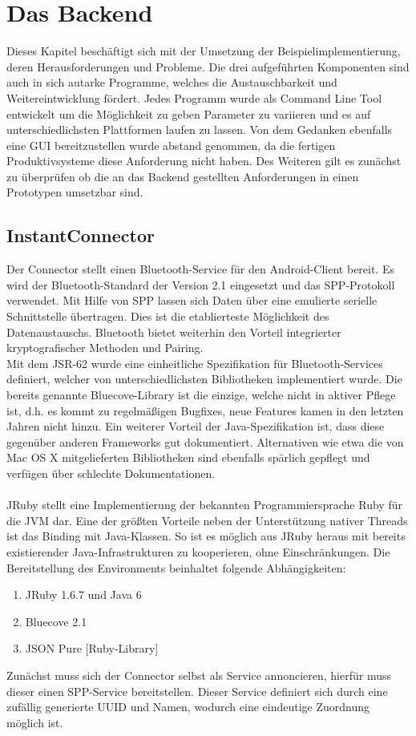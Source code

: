 \chapter{Das Backend}
Dieses Kapitel beschäftigt sich mit der Umsetzung der Beispielimplementierung, deren Herausforderungen und Probleme. Die drei aufgeführten Komponenten sind auch in sich autarke Programme, welches die Austauschbarkeit und Weitereintwicklung fördert. Jedes Programm wurde als Command Line Tool entwickelt um die Möglichkeit zu geben Parameter zu variieren und es auf unterschiedlichsten Plattformen laufen zu lassen. Von dem Gedanken ebenfalls eine GUI bereitzustellen wurde abstand genommen, da die fertigen Produktivsysteme diese Anforderung nicht haben. Des Weiteren gilt es zunächst zu überprüfen ob die an das Backend gestellten Anforderungen in einen Prototypen umsetzbar sind. 
\section{InstantConnector}
Der Connector stellt einen Bluetooth-Service für den Android-Client bereit. 
Es wird der Bluetooth-Standard der Version 2.1 eingesetzt und das SPP-Protokoll verwendet. Mit Hilfe von SPP lassen sich Daten über eine emulierte serielle Schnittstelle übertragen. Dies ist die etablierteste Möglichkeit des Datenaustauschs. Bluetooth bietet weiterhin den Vorteil integrierter kryptografischer Methoden und Pairing. \\
Mit dem JSR-62 wurde eine einheitliche Spezifikation für Bluetooth-Services definiert, welcher von unterschiedlichsten Bibliotheken implementiert wurde. Die bereits genannte Bluecove-Library ist die einzige, welche nicht in aktiver Pflege ist, d.h. es kommt zu regelmäßigen Bugfixes, neue Features kamen in den letzten Jahren nicht hinzu. Ein weiterer Vorteil der Java-Spezifikation ist, dass diese gegenüber anderen Frameworks gut dokumentiert. Alternativen wie etwa die von Mac OS X mitgelieferten Bibliotheken sind ebenfalls spärlich gepflegt und verfügen über schlechte Dokumentationen. 
\\\\
JRuby stellt eine Implementierung der bekannten Programmiersprache Ruby für die JVM dar. Eine der größten Vorteile neben der Unterstützung nativer Threads ist das Binding mit Java-Klassen. So ist es möglich aus JRuby heraus mit bereits existierender Java-Infrastrukturen zu kooperieren, ohne Einschränkungen. Die Bereitstellung des Environments beinhaltet folgende Abhängigkeiten:
\begin{enumerate}
     \item JRuby 1.6.7 und Java 6
     \item Bluecove 2.1
     \item JSON Pure [Ruby-Library]
\end{enumerate}
Zunächst muss sich der Connector selbst als Service annoncieren, hierfür muss dieser einen SPP-Service bereitstellen. Dieser Service definiert sich durch eine zufällig generierte UUID und Namen, wodurch eine eindeutige Zuordnung möglich ist. 

